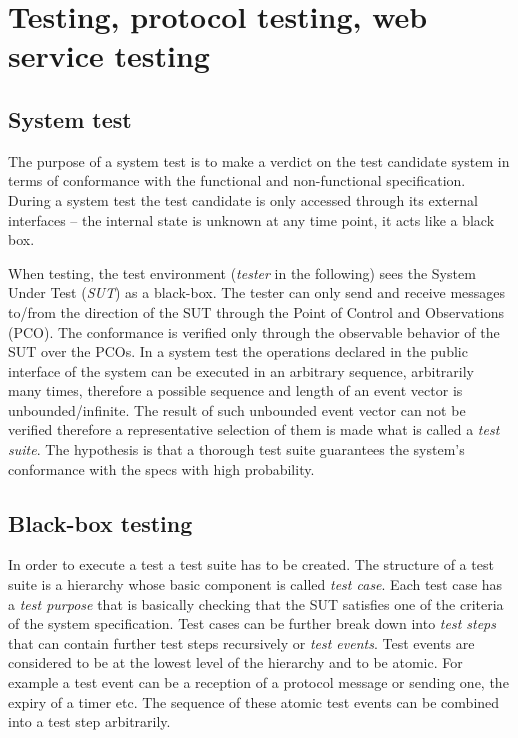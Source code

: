 \documentclass[a4paper]{article}
\begin{document}
\section{Testing, protocol testing, web service testing}

\subsection{System test}

The purpose of a system test is to make a verdict on the test candidate system in terms of conformance with the
functional and non-functional specification. During a system test the test candidate is only accessed through its
external interfaces -- the internal state is unknown at any time point, it acts like a black box.

When testing, the test environment (\emph{tester} in the following) sees the System Under Test (\emph{SUT}) as a
black-box. The tester can only send and receive messages to/from the direction of the SUT through the Point of Control
and
Observations (PCO). The conformance is verified only through the observable behavior of the SUT over the PCOs.
In a system test the operations declared in the public interface of the system can be executed in an arbitrary
sequence,
arbitrarily many times, therefore a possible sequence and length of an event vector is unbounded/infinite. The
result of such unbounded event vector can not be verified therefore a representative selection of them is made what is
called a \emph{test suite}. The hypothesis is that a thorough test suite guarantees the system's conformance with the
specs with high probability.

\subsection{Black-box testing}

In order to execute a test a test suite has to be created. The structure of a test suite is a hierarchy whose basic
component is called \emph{test case}. Each test case has a \emph{test purpose} that is basically checking that the SUT
satisfies one of the criteria of the system specification. Test cases can be further break down into \emph{test steps}
that can contain further test steps recursively or \emph{test events}. Test events are considered to be at the lowest
level of the hierarchy and to be atomic.
For example a test event can be a reception of a protocol message or sending one, the expiry of a timer etc. The
sequence of these atomic test events can be combined into a test step arbitrarily.
\end{document}
